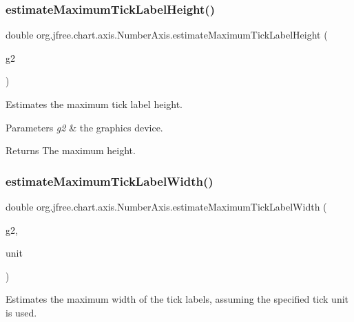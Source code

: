 \subsubsection{\texorpdfstring{estimate\+Maximum\+Tick\+Label\+Height()}{estimateMaximumTickLabelHeight()}}
{\footnotesize\ttfamily double org.\+jfree.\+chart.\+axis.\+Number\+Axis.\+estimate\+Maximum\+Tick\+Label\+Height (\begin{DoxyParamCaption}\item[{Graphics2D}]{g2 }\end{DoxyParamCaption})\hspace{0.3cm}{\ttfamily [protected]}}

Estimates the maximum tick label height.


\begin{DoxyParams}{Parameters}
{\em g2} & the graphics device.\\
\hline
\end{DoxyParams}
\begin{DoxyReturn}{Returns}
The maximum height. 
\end{DoxyReturn}
\mbox{\label{classorg_1_1jfree_1_1chart_1_1axis_1_1_number_axis_af9f08a86a5c23b4926d336856846ee2e}} 
\subsubsection{\texorpdfstring{estimate\+Maximum\+Tick\+Label\+Width()}{estimateMaximumTickLabelWidth()}}
{\footnotesize\ttfamily double org.\+jfree.\+chart.\+axis.\+Number\+Axis.\+estimate\+Maximum\+Tick\+Label\+Width (\begin{DoxyParamCaption}\item[{Graphics2D}]{g2,  }\item[{\mbox{\hyperlink{classorg_1_1jfree_1_1chart_1_1axis_1_1_tick_unit}{Tick\+Unit}}}]{unit }\end{DoxyParamCaption})\hspace{0.3cm}{\ttfamily [protected]}}

Estimates the maximum width of the tick labels, assuming the specified tick unit is used. 


